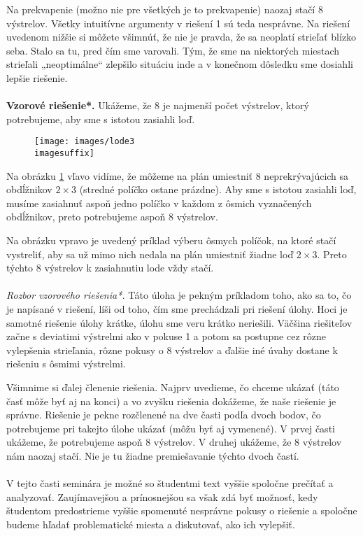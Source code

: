 {Na prekvapenie (možno nie pre všetkých je to prekvapenie) naozaj stačí 8 výstrelov. Všetky intuitívne argumenty v riešení 1 sú teda nesprávne. Na riešení uvedenom nižšie si môžete všimnúť, že nie je pravda, že sa neoplatí strieľať blízko seba. Stalo sa tu, pred čím sme varovali. Tým, že sme na niektorých miestach strieľali „neoptimálne“ zlepšilo situáciu inde a v konečnom dôsledku sme dosiahli lepšie riešenie.\\
\\
\textbf{Vzorové riešenie*.} Ukážeme, že 8 je najmenší počet výstrelov, ktorý potrebujeme, aby sme s istotou zasiahli loď.

\begin{figure}[h]
    \centering
    \texttt{[image: images/lode3\\imagesuffix]}
    \caption{}
    \label{fig:lode3}
\end{figure}


Na obrázku \ref{fig:lode3} vľavo vidíme, že môžeme na plán umiestniť 8 neprekrývajúcich sa obdĺžnikov $2\times 3$ (stredné políčko ostane prázdne). Aby sme s istotou zasiahli loď, musíme zasiahnuť aspoň jedno políčko v každom z ôsmich vyznačených obdĺžnikov, preto potrebujeme aspoň 8 výstrelov.

Na obrázku vpravo je uvedený príklad výberu ôsmych políčok, na ktoré stačí vystreliť, aby sa už mimo nich nedala na plán umiestniť žiadne loď $2\times3$. Preto týchto 8 výstrelov k zasiahnutiu lode vždy stačí.\\
\\
\textit{Rozbor vzorového riešenia*.} Táto úloha je pekným príkladom toho, ako sa to, čo je napísané v riešení, líši od toho, čím sme prechádzali pri riešení úlohy. Hoci je samotné riešenie úlohy krátke, úlohu sme veru krátko neriešili. Väčšina riešiteľov začne s deviatimi výstrelmi ako v pokuse 1 a potom sa postupne cez rôzne vylepšenia strieľania, rôzne pokusy o 8 výstrelov a ďalšie iné úvahy dostane k riešeniu s ôsmimi výstrelmi.

Všimnime si ďalej členenie riešenia. Najprv uvedieme, čo chceme ukázať (táto časť môže byť aj na konci) a vo zvyšku riešenia dokážeme, že naše riešenie je správne. Riešenie je pekne rozčlenené na dve časti podľa dvoch bodov, čo potrebujeme pri takejto úlohe ukázať (môžu byť aj vymenené). V prvej časti ukážeme, že potrebujeme aspoň 8 výstrelov. V druhej ukážeme, že 8 výstrelov nám naozaj stačí. Nie je tu žiadne premiešavanie týchto dvoch častí.\\
\\
\kom V tejto časti seminára je možné so študentmi text vyššie spoločne prečítať a analyzovať. Zaujímavejšou a prínosnejšou sa však zdá byť možnosť, kedy študentom predostrieme vyššie spomenuté nesprávne pokusy o riešenie a spoločne budeme hľadať problematické miesta a diskutovať, ako ich vylepšiť.
}
